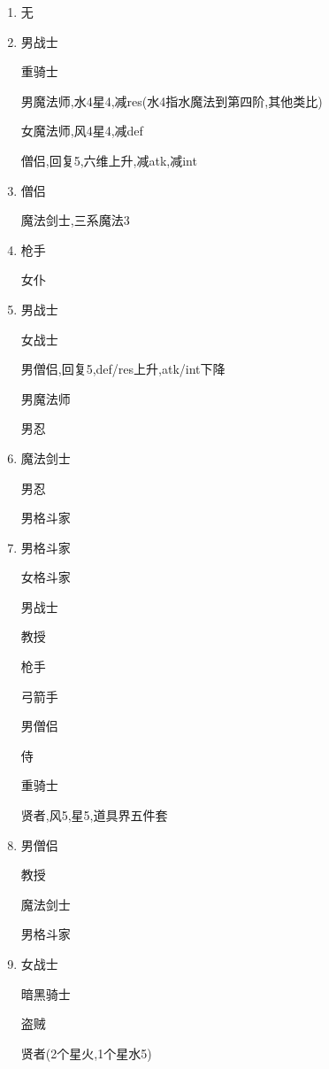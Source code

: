 	\begin{enumerate}\label{sec:泛用捕获列表}
		\item
		无
		\item
		男战士

		重骑士

		男魔法师,水4星4,减res(水4指水魔法到第四阶,其他类比)

		女魔法师,风4星4,减def

		僧侣,回复5,六维上升,减atk,减int

		\item
		{\color{red}{男忍,减hit,减spd,五系异常(毒眠麻忘魅)}}

		僧侣

		魔法剑士,三系魔法3
		
		\item
		枪手

		女仆

		{\color{red}{教授,星4,攻击属性上升(atk,int,hit,spd)}}

		\item
		男战士

		女战士

		男僧侣,回复5,def/res上升,atk/int下降

		男魔法师

		男忍

		\item
		魔法剑士

		男忍

		男格斗家

		\item
		男格斗家

		女格斗家

		男战士

		教授

		枪手

		弓箭手

		男僧侣

		侍

		重骑士

		贤者,风5,星5,道具界五件套
		
		\item
		男僧侣

		教授

		魔法剑士
		
		男格斗家

		\item
		女战士

		暗黑骑士

		盗贼

		贤者(2个星火,1个星水5)


\end{enumerate}

